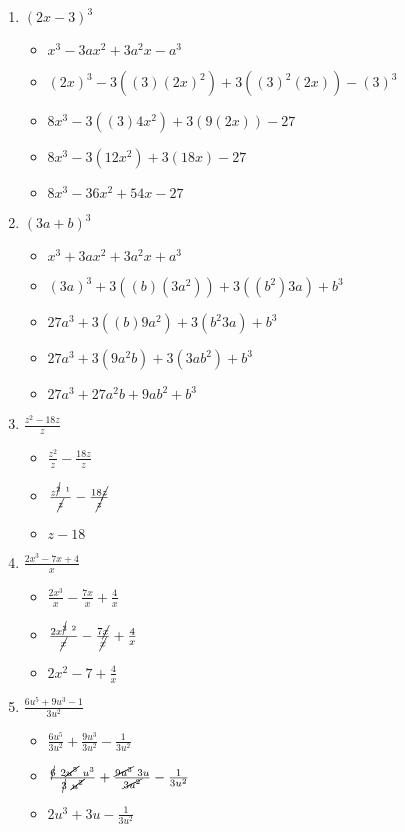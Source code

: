\documentclass{article}
\begin{document}
\begin{onehalfspace}
\begin{enumerate}
    \item $(2x - 3)^{3}$
    \begin{itemize}
        \item $x^{3} - 3ax^{2} + 3a^{2}x - a^{3}$
        \item $(2x)^{3} - 3((3)(2x)^{2}) + 3((3)^{2}(2x)) - (3)^{3}$
        \item $8x^{3} - 3((3)4x^{2}) + 3(9(2x)) - 27$
        \item $8x^{3} - 3(12x^{2}) + 3(18x) - 27$
        \item $8x^{3} - 36x^{2} + 54x - 27$
    \end{itemize}
    
    \item $(3a + b)^{3}$
    \begin{itemize}
        \item $x^{3} + 3ax^{2} + 3a^{2}x + a^{3}$
        \item $(3a)^{3} + 3((b)(3a^{2})) + 3((b^{2})3a) + b^{3}$
        \item $27a^{3} + 3((b)9a^{2}) + 3(b^{2}3a) + b^{3}$
        \item $27a^{3} + 3(9a^{2}b) + 3(3ab^{2}) + b^{3}$
        \item $27a^{3} + 27a^{2}b + 9ab^{2} + b^{3}$
    \end{itemize}

    \item $\frac{z^{2} - 18z}{z}$
    \begin{itemize}
        \item $\frac{z^{2}}{z} - \frac{18z}{z}$
        \item $\frac{z^{\cancel{2}\ 1}}{\cancel{z}} - \frac{18\cancel{z}}{\cancel{z}}$
        \item $z - 18$
    \end{itemize}

    \item $\frac{2x^{3} - 7x + 4}{x}$
    \begin{itemize}
        \item $\frac{2x^{3}}{x} - \frac{7x}{x} + \frac{4}{x}$
        \item $\frac{2x^{\cancel{3}\ 2}}{\cancel{x}} - \frac{7\cancel{x}}{\cancel{x}} + \frac{4}{x}$
        \item $2x^{2} - 7 + \frac{4}{x}$
    \end{itemize}

    \item $\frac{6u^{5} + 9u^{3} - 1}{3u^{2}}$
    \begin{itemize}
        \item $\frac{6u^{5}}{3u^{2}} + \frac{9u^{3}}{3u^{2}} - \frac{1}{3u^{2}}$
        \item $\frac{\cancel{6}\ 2\cancel{u^{5}}\ u^{3}}{\cancel{3}\ \cancel{u^{2}}} + \frac{\cancel{9u^{3}}\ 3u}{\cancel{3u^{2}}} - \frac{1}{3u^{2}}$
        \item $2u^{3} + 3u - \frac{1}{3u^{2}}$
    \end{itemize}


\end{enumerate}
\end{onehalfspace}
\end{document}
